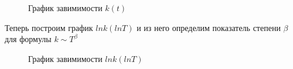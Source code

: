 \documentclass[a4paper, 12pt]{article}
\begin{document}
            \begin{figure}[ht]
                \caption{График завимимости $k(t)$}
                \label{k_graph}
            \end{figure}

            Теперь построим график $ln k (lnT)$ и из него определим показатель степени $\beta$ для формулы $k \sim T^{\beta}$

            \begin{figure}[ht]
                \caption{График завимимости $ln k (lnT)$}
                \label{lnk_graph}
            \end{figure}
\end{document}
